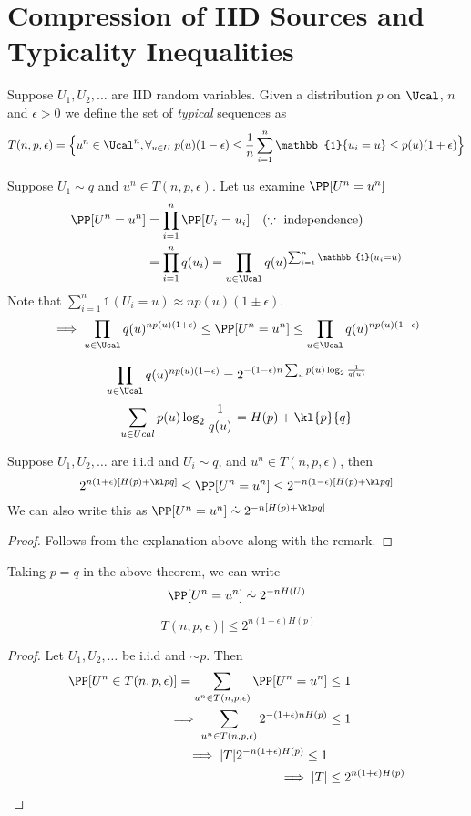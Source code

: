 \section{Compression of IID Sources and Typicality Inequalities}
\begin{definition}
Suppose $U_1, U_2, \dots$ are IID random variables. Given a distribution $p$ on $\Ucal$, $n$ and $\epsilon > 0$ we define the set of \textit{typical} sequences as
\[ T(n,p,\epsilon) = \Big\{ u^n \in \Ucal^n, \forall_{u\in U}\; p(u)(1-\epsilon) \leq \frac{1}{n} \sum_{i=1}^n \mathbb{1}\{u_i = u\} \leq p(u)(1+\epsilon)\Big\}\]
\end{definition}
Suppose $U_1 \sim q$ and $u^n \in T(n,p,\epsilon)$. Let us examine $\PP[U^n = u^n]$
\begin{align*}
\PP[U^n = u^n] &= \prod_{i=1}^n \PP[U_i=u_i] \quad (\because \text{ independence}) \\
&= \prod_{i=1}^n q(u_i) = \prod_{u \in \Ucal} q(u) ^{\sum_{i=1}^n \mathbb{1} (u_i = u)}
\end{align*}
Note that $\sum_{i=1}^n \mathbb{1}(U_i = u) \approx n p(u) (1 \pm \epsilon)$.
\[ \implies \prod_{u \in \Ucal} q(u) ^{np(u)(1+\epsilon)} \leq \PP[U^n = u^n] \leq \prod_{u \in \Ucal} q(u) ^{np(u)(1-\epsilon)}\]
\begin{remark}
\[\prod_{u \in \Ucal} q(u)^{np(u)(1-\epsilon)} = 2^{-(1-\epsilon)n \sum_u p(u)\log_2\frac{1}{q(u)}} \]
\[\sum_{u \in Ucal} p(u) \log_2 \frac{1}{q(u)} = H(p) + \kl{p}{q}\]
\end{remark}
\begin{theorem}
Suppose $U_1, U_2, \dots$ are i.i.d and $U_i \sim q$, and $u^n \in T(n,p,\epsilon)$, then
\[2^{n(1+\epsilon)[H(p) + \kl pq]} \leq \PP[U^n = u^n] \leq 2^{-n(1-\epsilon)[H(p) + \kl pq]} \]
We can also write this as $\PP[U^n = u^n] \mathrel{\dot\sim} 2^{-n[H(p) + \kl pq]}$
\end{theorem}
\begin{proof}
Follows from the explanation above along with the remark.
\end{proof}
\begin{corollary}
Taking $p = q$ in the above theorem, we can write
\[\PP[U^n = u^n] \mathrel{\dot\sim} 2^{-n H(U)} \]
\end{corollary}
\begin{theorem}
\[|T(n,p,\epsilon)| \leq 2^{n(1+\epsilon)H(p)}\]
\end{theorem}
\begin{proof}
Let $U_1, U_2, \dots$ be i.i.d and $\sim p$. Then
\begin{align*}
    \PP[U^n \in T(n,p,\epsilon)] = \sum_{u^n \in T(n,p,\epsilon)} \PP[U^n = u^n] &\leq 1 \\
    \implies \sum_{u^n \in T(n,p,\epsilon)} 2^{-(1+\epsilon) n H(p)} &\leq 1 \\
    \implies |T| 2^{-n(1+\epsilon) H(p)} \leq 1 \\
    \implies |T| &\leq 2^{n(1+\epsilon)H(p)}
\end{align*}
\end{proof}
